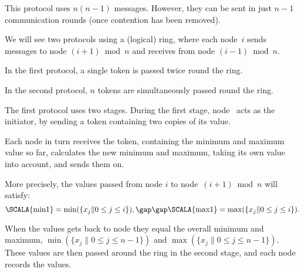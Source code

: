 \documentclass[notes,color]{sepslide0}
\def\set#1{\{#1\}}
\begin{document}

\begin{slide}

This protocol uses $n(n-1)$ messages.  However, they can be sent in just $n-1$
communication rounds (once contention has been removed).
\end{slide}


\begin{slide}

We will see two protocols using a (logical) ring, where each node~$i$ sends
messages to node $(i+1) \bmod n$ and receives from node $(i-1) \bmod n$.
\begin{center}
\end{center}

In the first protocol, a single token is passed twice round the ring.  

In the second protocol, $n$ tokens are simultaneously passed round the ring. 
\end{slide}


\begin{slide}

The first protocol uses two stages.  During the first stage, node~
acts as the initiator, by sending a token containing two copies of its value.  

Each node in turn receives the token, containing the minimum and maximum value
so far, calculates the new minimum and maximum, taking its own value into
account, and sends them on.

More precisely,  the values 
passed from node $i$ to node~$(i+1) \bmod n$ will satisfy:
%
\[
\mbox{\SCALA{min1}}  = \min(\set{x_j \| 0 \le j \le i}), 
\gap\gap
\mbox{\SCALA{max1}} = \max(\set{x_j \| 0 \le j \le i}).
\]

When the values gets back to node  they equal the overall minimum and
maximum, $\min(\set{x_j \| 0 \le j \le n-1})$ and $\max(\set{x_j \| 0 \le j \le
  n-1})$.  These values are then passed around the ring in the second stage,
and each node records the values.
\end{slide}
\end{document}
